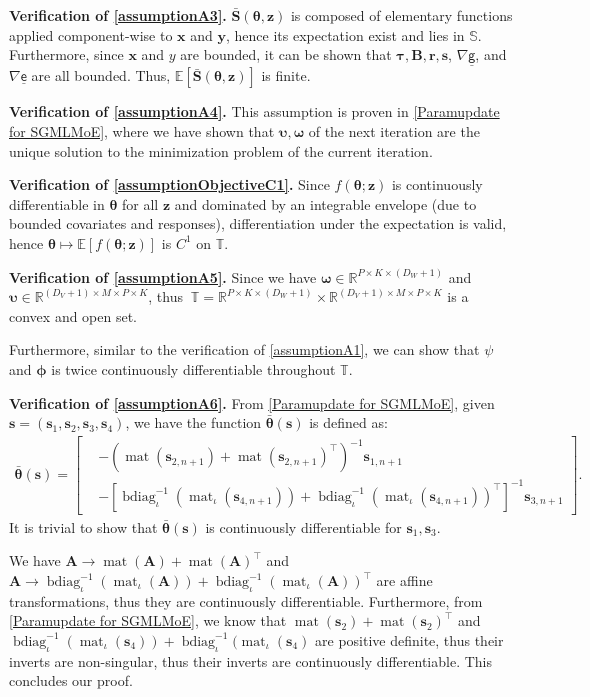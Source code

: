\documentclass{article}
\DeclareMathOperator*{\mat}{mat}
\DeclareMathOperator{\bdiag}{bdiag}
\def\phib        {{\sbmm{\phi}}\XS}        \def\Phib       {{\sbmm{\Phi}}\XS}
\def\XS{\xspace}
\def\sbmm#1{\ensuremath{\boldsymbol{#1}}}
\def\bars{\bar{\vS}}
\def\sfg{\mathsf{g}}
\def\ex{\mathsf{e}}
\def\rvz{{\mathbf{z}}}
\def\vtau{{\bm{\tau}}}
\def\vomega{{\bm{\omega}}}
\def\vupsilon{{\bm{\upsilon}}}
\def\vtheta{{\bm{\theta}}}
\def\vr{{\bm{r}}}
\def\vs{{\bm{s}}}
\def\vS{{\bm{S}}}
\def\vx{{\bm{x}}}
\def\vy{{\bm{y}}}
\def\vz{{\bm{z}}}
\def\evy{{y}}
\def\mA{{\bm{A}}}
\def\mB{{\bm{B}}}
\def\sR{{\mathbb{R}}}
\def\sT{{\mathbb{T}}}
\newcommand{\E}{\mathbb{E}}
\begin{document}
\textbf{Verification of \cref{assumptionA3}.} $\bars(\vtheta,\vz)$ is composed of elementary functions applied component-wise to $\vx$ and $\vy$, hence its expectation exist and lies in $\mathbb{S}$.
Furthermore, since $\vx$ and $\evy$ are bounded, it can be shown that $\vtau,\mB,\vr,\vs$, $\nabla \underline{\sfg}$, and $\nabla \underline{\ex}$ are all bounded. Thus, $\mathbb{E}[\bars(\vtheta,\vz)]$ is finite.

\textbf{Verification of \cref{assumptionA4}.} This assumption is proven in \cref{Paramupdate for SGMLMoE}, where we have shown that $\vupsilon,\vomega$ of the next iteration are the unique solution to the minimization problem of the current iteration.

\textbf{Verification of \cref{assumptionObjectiveC1}.} Since $f(\vtheta;\vz)$ is continuously differentiable in $\vtheta$ for all $\vz$
and dominated by an integrable envelope (due to bounded covariates and responses),
differentiation under the expectation is valid, hence
$\vtheta \mapsto \E[f(\vtheta;\rvz)]$ is $C^1$ on $\sT$.

\textbf{Verification of \cref{assumptionA5}.} Since we have $\vomega \in \sR^{P\times K\times (D_W+1)}$ and $\vupsilon\in \sR^{(D_V+1)\times M\times P\times K}$, thus $~\mathbb{T}=\sR^{P\times K\times (D_W+1)}\times\sR^{(D_V+1)\times M\times P\times K}$ is a convex and open set.
\par Furthermore, similar to the verification of \cref{assumptionA1}, we can show that $\psi$ and $\phib$ is twice continuously differentiable throughout $\mathbb{T}$.

\textbf{Verification of \cref{assumptionA6}.} From \cref{Paramupdate for SGMLMoE}, given $\vs=(\vs_1,\vs_2,\vs_3,\vs_4)$, we have the function $\bar{\vtheta}(\vs)$ is defined as:
\begin{align*}
    \bar{\vtheta}(\vs)=\begin{bmatrix}
      &-\left(\mat(\vs_{2,n+1}) + \mat(\vs_{2,n+1})^{\top}\right)^{-1} \vs_{1,n+1}\\
      &-\left[{\bdiag}_{\iota}^{-1}({\mat}_{\iota}(\vs_{4,n+1}))+{\bdiag}_{\iota}^{-1}({\mat}_{\iota}(\vs_{4,n+1}))^{\top}\right]^{-1} \vs_{3,n+1}
    \end{bmatrix}.
\end{align*}
It is trivial to show that $\bar{\vtheta}(\vs)$ is continuously differentiable for $\vs_1, \vs_3$. 
\par We have $\mA\rightarrow \mat(\mA)+\mat(\mA)^{\top}$ and $\mA\rightarrow {\bdiag}_{\iota}^{-1}({\mat}_{\iota}(\mA))+{\bdiag}_{\iota}^{-1}({\mat}_{\iota}(\mA))^{\top}$ are affine transformations, thus they are continuously differentiable. Furthermore, from \cref{Paramupdate for SGMLMoE}, we know that $\mat(\vs_2)+\mat(\vs_2)^{\top}$ and ${\bdiag}_{\iota}^{-1}({\mat}_{\iota}(\vs_{4}))+{\bdiag}_{\iota}^{-1}({\mat}_{\iota}(\vs_{4})$ are positive definite, thus their inverts are non-singular, thus their inverts are continuously differentiable. This concludes our proof.
\end{document}
